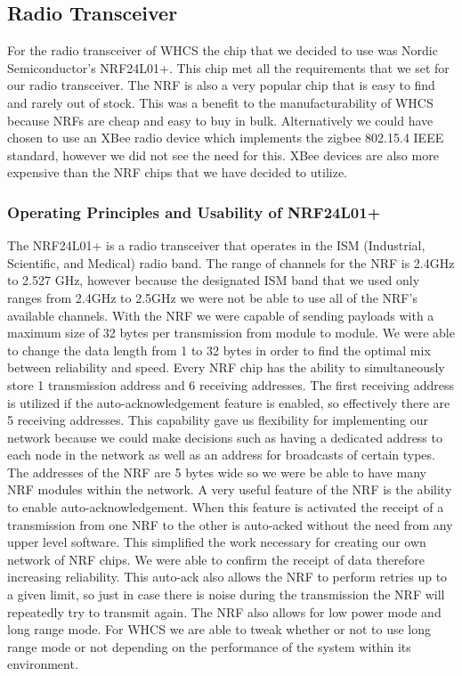 \subsection{Radio Transceiver}
For the radio transceiver of WHCS the chip that we decided to use was Nordic
Semiconductor{}'s NRF24L01+. This chip met all the requirements that we set
for our radio transceiver. The NRF is also a very popular chip that is easy to
find and rarely out of stock. This was a benefit to the manufacturability of
WHCS because NRFs are cheap and easy to buy in bulk. Alternatively we could
have chosen to use an XBee radio device which implements the zigbee 802.15.4
IEEE standard, however we did not see the need for this. XBee devices are also
more expensive than the NRF chips that we have decided to utilize.

\subsubsection{Operating Principles and Usability of NRF24L01+}
The NRF24L01+ is a radio transceiver that operates in the ISM (Industrial,
Scientific, and Medical) radio band. The range of channels for the NRF is
2.4GHz to 2.527 GHz, however because the designated ISM band that we used 
only ranges from 2.4GHz to 2.5GHz we were not be able to use all of the NRF{}'s
available channels. With the NRF we were capable of sending payloads with a
maximum size of 32 bytes per transmission from module to module. We were
able to change the data length from 1 to 32 bytes in order to find the optimal
mix between reliability and speed. Every NRF chip has the ability to
simultaneously store 1 transmission address and 6 receiving addresses. The
first receiving address is utilized if the auto{}-acknowledgement feature is
enabled, so effectively there are 5 receiving addresses.  This capability gave
us flexibility for implementing our network because we could make decisions such as
having a dedicated address to each node in the network as well as an address
for broadcasts of certain types. The addresses of the NRF are 5 bytes wide so
we were be able to have many NRF modules within the network. A very useful
feature of the NRF is the ability to enable auto{}-acknowledgement. When this
feature is activated the receipt of a transmission from one NRF to the other is
auto{}-acked without the need from any upper level software. This simplified 
the work necessary for creating our own network of NRF chips. We were able
to confirm the receipt of data therefore increasing reliability.  This
auto{}-ack also allows the NRF to perform retries up to a given limit, so just
in case there is noise during the transmission the NRF will repeatedly try to
transmit again. The NRF also allows for low power mode and long range mode.
For WHCS we are able to tweak whether or not to use long range mode or not
depending on the performance of the system within its environment.


